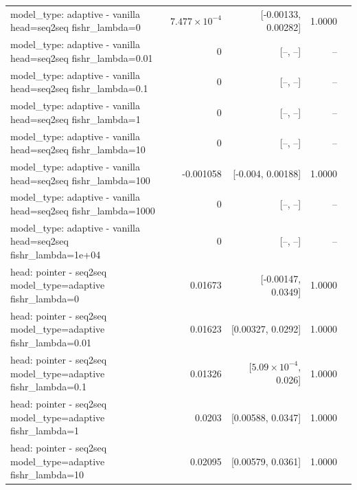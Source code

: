 \documentclass[10pt]{article}
\makeatletter
\newcommand{\stackcell}[1]{\begin{tabular}[t]{@{}l@{}}#1\end{tabular}}
\makeatother
\begin{document}
{\begin{longtable}{lrrrl}
\stackcell{model\_type: adaptive - vanilla\\\footnotesize head=seq2seq fishr\_lambda=0 } & $7.477\times10^{-4}$ & [-0.00133, 0.00282] & 1.0000 & \\
\stackcell{model\_type: adaptive - vanilla\\\footnotesize head=seq2seq fishr\_lambda=0.01 } & 0 & [--, --] & -- & \\
\stackcell{model\_type: adaptive - vanilla\\\footnotesize head=seq2seq fishr\_lambda=0.1 } & 0 & [--, --] & -- & \\
\stackcell{model\_type: adaptive - vanilla\\\footnotesize head=seq2seq fishr\_lambda=1 } & 0 & [--, --] & -- & \\
\stackcell{model\_type: adaptive - vanilla\\\footnotesize head=seq2seq fishr\_lambda=10 } & 0 & [--, --] & -- & \\
\stackcell{model\_type: adaptive - vanilla\\\footnotesize head=seq2seq fishr\_lambda=100 } & -0.001058 & [-0.004, 0.00188] & 1.0000 & \\
\stackcell{model\_type: adaptive - vanilla\\\footnotesize head=seq2seq fishr\_lambda=1000 } & 0 & [--, --] & -- & \\
\stackcell{model\_type: adaptive - vanilla\\\footnotesize head=seq2seq fishr\_lambda=1e+04 } & 0 & [--, --] & -- & \\
\stackcell{head: pointer - seq2seq\\\footnotesize model\_type=adaptive fishr\_lambda=0 } & 0.01673 & [-0.00147, 0.0349] & 1.0000 & \\
\stackcell{head: pointer - seq2seq\\\footnotesize model\_type=adaptive fishr\_lambda=0.01 } & 0.01623 & [0.00327, 0.0292] & 1.0000 & \\
\stackcell{head: pointer - seq2seq\\\footnotesize model\_type=adaptive fishr\_lambda=0.1 } & 0.01326 & [$5.09\times10^{-4}$, 0.026] & 1.0000 & \\
\stackcell{head: pointer - seq2seq\\\footnotesize model\_type=adaptive fishr\_lambda=1 } & 0.0203 & [0.00588, 0.0347] & 1.0000 & \\
\stackcell{head: pointer - seq2seq\\\footnotesize model\_type=adaptive fishr\_lambda=10 } & 0.02095 & [0.00579, 0.0361] & 1.0000 & \\

\end{longtable}}
\end{document}

